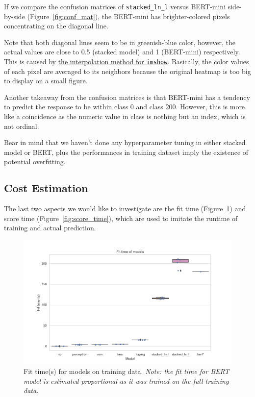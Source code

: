 \documentclass[
]{kaohandt}
\begin{document}
If we compare the confusion matrices of \texttt{stacked\_ln\_l} versus BERT-mini side-by-side (Figure~\ref{fig:conf_mat}), the BERT-mini has brighter-colored pixels concentrating on the diagonal line.

Note that both diagonal lines seem to be in greenish-blue color, however, the actual values are close to 0.5 (stacked model) and 1 (BERT-mini) respectively. This is caused by \href{https://matplotlib.org/stable/gallery/images_contours_and_fields/interpolation_methods.html}{the interpolation method for \texttt{imshow}}. Basically, the color values of each pixel are averaged to its neighbors because the original heatmap is too big to display on a small figure.

Another takeaway from the confusion matrices is that BERT-mini has a tendency to predict the response to be within class 0 and class 200. However, this is more like a coincidence as the numeric value in class is nothing but an index, which is not ordinal.


Bear in mind that we haven’t done any hyperparameter tuning in either stacked model or BERT, plus the performances in training dataset imply the existence of potential overfitting.

\subsection*{Cost Estimation}

The last two aspects we would like to investigate are the fit time (Figure~\ref{fig:fit_time}) and score time (Figure~\ref{fig:score_time}), which are used to imitate the runtime of training and actual prediction.

\begin{figure}[h]
	\includegraphics[]{metric_fit_time.png}
	\caption{Fit time(s) for models on training data. \emph{Note: the fit time for BERT model is estimated proportional as it was trained on the full training data.}}
	\label{fig:fit_time}
\end{figure}
\end{document}
